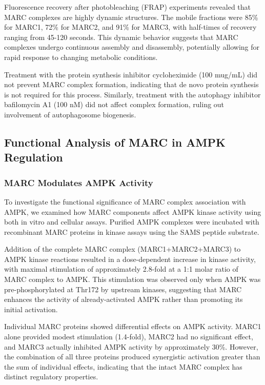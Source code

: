 \documentclass[11pt,a4paper]{article}
\begin{document}
Fluorescence recovery after photobleaching (FRAP) experiments revealed that MARC complexes are highly dynamic structures. The mobile fractions were 85\% for MARC1, 72\% for MARC2, and 91\% for MARC3, with half-times of recovery ranging from 45-120 seconds. This dynamic behavior suggests that MARC complexes undergo continuous assembly and disassembly, potentially allowing for rapid response to changing metabolic conditions.

Treatment with the protein synthesis inhibitor cycloheximide (100 mug/mL) did not prevent MARC complex formation, indicating that de novo protein synthesis is not required for this process. Similarly, treatment with the autophagy inhibitor bafilomycin A1 (100 nM) did not affect complex formation, ruling out involvement of autophagosome biogenesis.

\subsection{Functional Analysis of MARC in AMPK Regulation}

\subsubsection{MARC Modulates AMPK Activity}

To investigate the functional significance of MARC complex association with AMPK, we examined how MARC components affect AMPK kinase activity using both in vitro and cellular assays. Purified AMPK complexes were incubated with recombinant MARC proteins in kinase assays using the SAMS peptide substrate.

Addition of the complete MARC complex (MARC1+MARC2+MARC3) to AMPK kinase reactions resulted in a dose-dependent increase in kinase activity, with maximal stimulation of approximately 2.8-fold at a 1:1 molar ratio of MARC complex to AMPK. This stimulation was observed only when AMPK was pre-phosphorylated at Thr172 by upstream kinases, suggesting that MARC enhances the activity of already-activated AMPK rather than promoting its initial activation.

Individual MARC proteins showed differential effects on AMPK activity. MARC1 alone provided modest stimulation (1.4-fold), MARC2 had no significant effect, and MARC3 actually inhibited AMPK activity by approximately 30\%. However, the combination of all three proteins produced synergistic activation greater than the sum of individual effects, indicating that the intact MARC complex has distinct regulatory properties.
\end{document}
